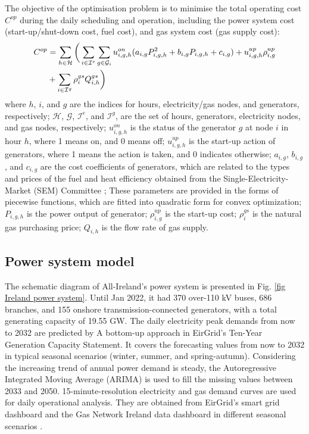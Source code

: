 \documentclass[sn-mathphys,Numbered]{sn-jnl}%
\theoremstyle{thmstyleone}%
\theoremstyle{thmstyletwo}%
\theoremstyle{thmstylethree}%
\begin{document}
The objective of the optimisation problem is to minimise the total operating cost $C^{op}$ during the daily scheduling and operation, including the power system cost (start-up/shut-down cost, fuel cost), and gas system cost (gas supply cost):
\begin{align}
    C^{op} & = \sum_{h \in \mathcal{H}} \bigg( \sum_{i \in \mathcal{I}^e} \sum_{g \in \mathcal{G}_i} u^{on}_{i,g,h} (a_{i,g} P_{i,g,h}^2 + b_{i,g} P_{i,g,h} + c_{i,g}) + u_{i,g,h}^{up} \rho^{up}_{i,g}
    \notag \\
    & + \sum_{i \in \mathcal{I}^g} \rho_{i}^{gs} Q_{i,h}^{gs} \bigg)
\end{align}
where $h$, $i$, and $g$ are the indices for hours, electricity/gas nodes, and generators, respectively; $\mathcal{H}$, $\mathcal{G}$, $\mathcal{I}^e$, and $\mathcal{I}^g$, are the set of hours, generators, electricity nodes, and gas nodes, respectively; $u^{on}_{i,g,h}$ is the status of the generator $g$ at node $i$ in hour $h$, where 1 means on, and 0 means off; $u_{i,g,h}^{up}$ is the start-up action of generators, where 1 means the action is taken, and 0 indicates otherwise;
$a_{i,g}$, $b_{i,g}$, and $c_{i,g}$ are the cost coefficients of generators, which are related to the types and prices of the fuel and heat efficiency obtained from the Single-Electricity-Market (SEM) Committee \cite{SEMPLEXOS}; These parameters are provided in the forms of piecewise functions, which are fitted into quadratic form for convex optimization; $P_{i,g,h}$ is the power output of generator; $\rho^{up}_{i,g}$ is the start-up cost; $\rho_{i}^{gs}$ is the natural gas purchasing price; $Q_{i,h}$ is the flow rate of gas supply.

\subsection{Power system model}

The schematic diagram of All-Ireland's power system is presented in Fig. \ref{fig Ireland power system}. Until Jan 2022, it had 370 over-110 kV buses,  686 branches, and 155 onshore transmission-connected generators, with a total generating capacity of 19.55 GW. The daily electricity peak demands from now to 2032
are predicted by A bottom-up approach in EirGrid’s Ten-Year
Generation Capacity Statement\cite{GenerationCapacity}. It covers the forecasting values from now to 2032 in typical seasonal scenarios (winter, summer, and spring-autumn). Considering the increasing trend of annual power demand is steady, the Autoregressive Integrated Moving Average (ARIMA) is used to fill the missing values between 2033 and 2050. 15-minute-resolution electricity and gas demand curves are used for daily operational analysis. They are obtained from EirGrid’s smart grid dashboard and the Gas Network Ireland data dashboard in different seasonal scenarios \cite{SmartGridDashboard, GasconsumptionbyMarketSector}.
\end{document}
